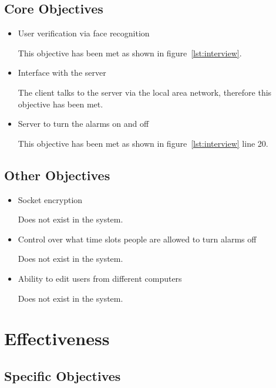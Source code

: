 \documentclass[a4paper]{article}
\begin{document}
	\subsection{Core Objectives}
		
		\begin{itemize}
			\item User verification via face recognition

				This objective has been met as shown in figure~\ref{lst:interview}.

			\item Interface with the server

				The client talks to the server via the local area network, therefore this objective has been met.

			\item Server to turn the alarms on and off

				This objective has been met as shown in figure~\ref{lst:interview} line 20.
		\end{itemize}

	\subsection{Other Objectives}
		
		\begin{itemize}
			\item Socket encryption

				Does not exist in the system.

			\item Control over what time slots people are allowed to turn alarms off

				Does not exist in the system.

			\item Ability to edit users from different computers

				Does not exist in the system.
		\end{itemize}




\section{Effectiveness}

	\subsection{Specific Objectives}
\end{document}
